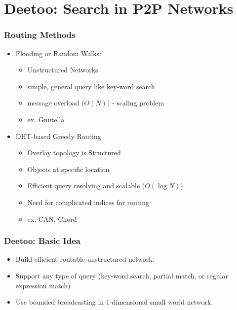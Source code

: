 \documentclass[red]{beamer}
\begin{document}
\section{Deetoo: Search in P2P Networks}



\begin{frame}
\frametitle{Routing Methods}
\begin{itemize}
\item
Flooding or Random Walks:
\begin{itemize}
\item Unstructured Networks
\item simple, general query like key-word search
\item message overload ($O(N)$) - scaling problem
\item ex. Gnutella
\end{itemize}
\item
DHT-based Greedy Routing
\begin{itemize}
\item Overlay topology is Structured
\item Objects at specific location
\item Efficient query resolving and scalable ($O(\log{N})$)
\item Need for complicated indices for routing
\item ex. CAN, Chord
\end{itemize}
\end{itemize}

\end{frame}


\begin{frame}
\frametitle{Deetoo: Basic Idea}
\begin{itemize}
\item
Build efficient routable unstructured network.
\item
Support any type of query (key-word search, partial match, or regular expression match)
\item
Use bounded broadcasting in 1-dimensional small world network.
\end{itemize}
\end{frame}
\end{document}
